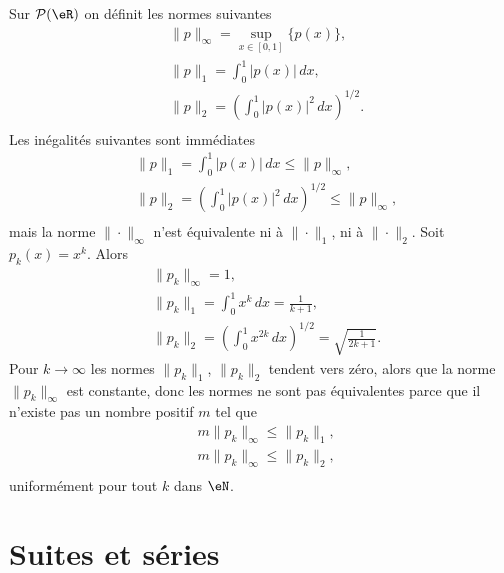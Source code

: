 Sur $\mathcal{P}(\eR)$ on définit les normes suivantes 
\begin{equation}
\begin{aligned}
&\|p\|_\infty=\sup_{x\in[0,1]}\{p(x)\},\\
&\|p\|_1 =\int_0^1|p(x)|\, dx,\\
&\|p\|_2 =\left(\int_0^1|p(x)|^2\, dx\right)^{1/2}.\\
\end{aligned}
\end{equation}
Les inégalités suivantes sont  immédiates
\begin{equation}
\begin{aligned}
&\|p\|_1 =\int_0^1|p(x)|\, dx\leq \|p\|_\infty,\\
&\|p\|_2 =\left(\int_0^1|p(x)|^2\, dx\right)^{1/2}\leq \|p\|_\infty,\\
\end{aligned}
\end{equation}
mais la norme $\|\cdot\|_\infty$ n'est  équivalente ni à $\|\cdot\|_1$, ni à $\|\cdot\|_2$. Soit $p_k(x)= x^k$. Alors
\begin{equation}
\begin{aligned}
&\|p_k\|_\infty=1,\\
&\|p_k\|_1 =\int_0^1x^k\, dx=  \frac{1}{k+1},\\
&\|p_k\|_2 =\left(\int_0^1x^{2k}\, dx\right)^{1/2}=\sqrt{\frac{1}{2k+1}}.
\end{aligned}
\end{equation}
Pour $k\to \infty$ les normes $\|p_k\|_1$, $\|p_k\|_2$ tendent vers zéro, alors que la norme $\|p_k\|_\infty$ est constante, donc les normes ne sont pas équivalentes parce que il n'existe pas un nombre positif $m$ tel que 
\begin{equation}
\begin{aligned}
& m \|p_k\|_\infty\leq \|p_k\|_1 ,\\
& m \|p_k\|_\infty\leq \|p_k\|_2 ,\\
\end{aligned}
\end{equation}
uniformément pour tout $k$ dans $\eN$.

\section{Suites et séries}\label{Sect_suites}

